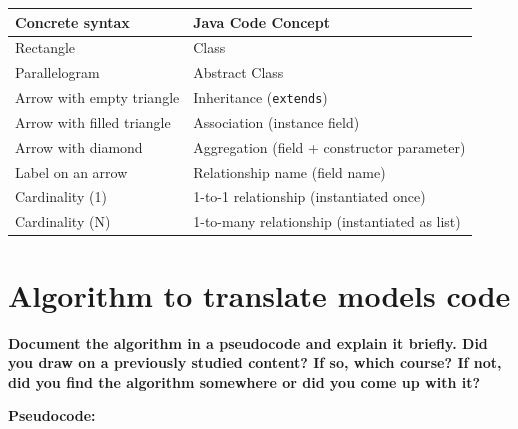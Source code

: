 \begin{table}[h]
    \centering
    \begin{tabular}{|p{5cm}|p{9cm}|}
    \hline
    \textbf{Concrete syntax} & \textbf{Java Code Concept} \\
    \hline
    
    Rectangle & Class \\
    \hline
    
    Parallelogram & Abstract Class \\
    \hline
    
    Arrow with empty triangle & Inheritance (\texttt{extends}) \\
    \hline
    
    Arrow with filled triangle & Association (instance field) \\
    \hline
    
    Arrow with diamond & Aggregation (field + constructor parameter) \\
    \hline
    
    Label on an arrow & Relationship name (field name) \\
    \hline
    
    Cardinality (1) & 1-to-1 relationship (instantiated once) \\
    \hline
    
    Cardinality (N) & 1-to-many relationship (instantiated as list) \\
    \hline
    \end{tabular}
\end{table}    

\newpage

\section{Algorithm to translate models code}

\textbf{Document the algorithm in a pseudocode and explain it briefly. Did you draw on a
previously studied content? If so, which course? If not, did you find the algorithm
somewhere or did you come up with it?}

\textbf{Pseudocode:}

